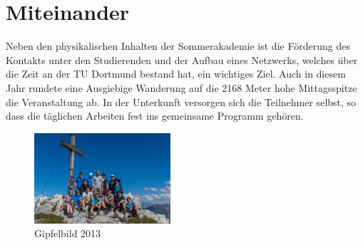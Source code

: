 \documentclass[pdftex, twocolumn=true, parskip=half]{scrartcl}
\begin{document}
\section{Miteinander}
Neben den physikalischen Inhalten der Sommerakademie ist die Förderung des Kontakts unter den Studierenden und der Aufbau eines Netzwerks, welches über die Zeit an der TU Dortmund bestand hat, ein wichtiges Ziel. Auch in diesem Jahr rundete eine Ausgiebige Wanderung auf die 2168 Meter hohe Mittagsspitze die Veranstaltung ab. In der Unterkunft versorgen sich die Teilnehmer selbst, so dass die täglichen Arbeiten fest ins gemeinsame Programm gehören.
\begin{figure}[!h]
\centering
\includegraphics[width=0.45\textwidth]{figs/allgemein/gipfel.jpg}
\caption{Gipfelbild 2013}
\end{figure}
\end{document}
